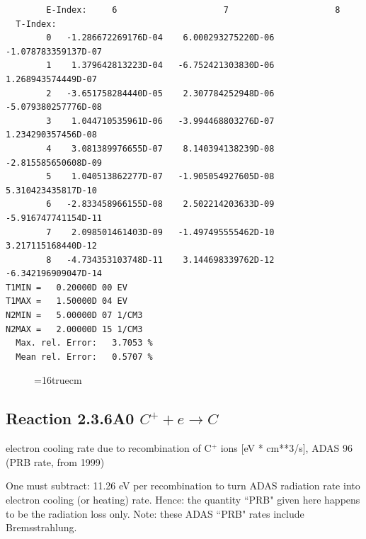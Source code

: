 \documentclass[12pt,dvipdfmx]{article}
\begin{document}
\begin{small}
\begin{verbatim}
        E-Index:     6                     7                     8
  T-Index:
        0   -1.286672269176D-04    6.000293275220D-06   -1.078783359137D-07
        1    1.379642813223D-04   -6.752421303830D-06    1.268943574449D-07
        2   -3.651758284440D-05    2.307784252948D-06   -5.079380257776D-08
        3    1.044710535961D-06   -3.994468803276D-07    1.234290357456D-08
        4    3.081389976655D-07    8.140394138239D-08   -2.815585650608D-09
        5    1.040513862277D-07   -1.905054927605D-08    5.310423435817D-10
        6   -2.833458966155D-08    2.502214203633D-09   -5.916747741154D-11
        7    2.098501461403D-09   -1.497495555462D-10    3.217115168440D-12
        8   -4.734353103748D-11    3.144698339762D-12   -6.342196909047D-14
T1MIN =   0.20000D 00 EV
T1MAX =   1.50000D 04 EV
N2MIN =   5.00000D 07 1/CM3
N2MAX =   2.00000D 15 1/CM3
  Max. rel. Error:   3.7053 %
  Mean rel. Error:   0.5707 %
\end{verbatim}\end{small}

\begin{figure} \label{2.8ilr}
\epsfxsize=16truecm 
\end{figure}
\newpage

\subsection{
  Reaction 2.3.6A0  $C^+ + e \rightarrow C  $
}
electron cooling rate due to recombination of C$^+$ ions [eV * cm**3/s],
ADAS 96  (PRB rate, from 1999)

One must subtract: 11.26 eV per recombination to turn ADAS radiation
rate into electron cooling (or heating) rate. Hence: the quantity
``PRB" given here happens to be the radiation loss only. Note: these
ADAS ``PRB" rates include Bremsstrahlung.
\end{document}
